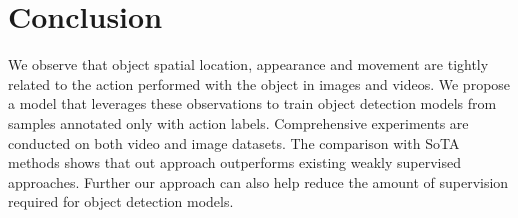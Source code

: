 \documentclass[10pt,twocolumn,letterpaper]{article}
\begin{document}
\section{Conclusion}
\vspace{-0.5\baselineskip}
We observe that object spatial location, appearance and movement are tightly related to the action performed with the object in images and videos. We propose a model that leverages these observations to train object detection models from samples annotated only with action labels. Comprehensive experiments are conducted on both video and image datasets. The comparison with SoTA methods shows that out approach outperforms existing weakly supervised approaches. Further our approach can also help reduce the amount of supervision required for object detection models.

%
 
\end{document}
